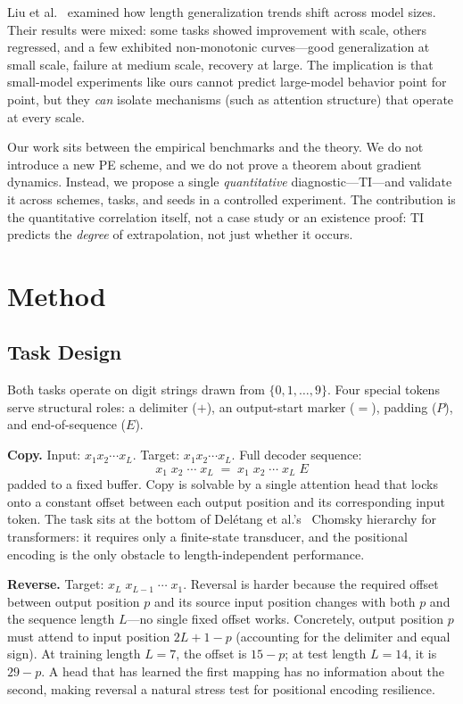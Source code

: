 \documentclass[10pt,twocolumn]{article}
\begin{document}
Liu et al.~\cite{liu2024scaling} examined how length generalization trends shift across model sizes.
Their results were mixed: some tasks showed improvement with scale, others regressed, and a few exhibited non-monotonic curves---good generalization at small scale, failure at medium scale, recovery at large.
The implication is that small-model experiments like ours cannot predict large-model behavior point for point, but they \emph{can} isolate mechanisms (such as attention structure) that operate at every scale.

Our work sits between the empirical benchmarks and the theory.
We do not introduce a new PE scheme, and we do not prove a theorem about gradient dynamics.
Instead, we propose a single \emph{quantitative} diagnostic---TI---and validate it across schemes, tasks, and seeds in a controlled experiment.
The contribution is the quantitative correlation itself, not a case study or an existence proof: TI predicts the \emph{degree} of extrapolation, not just whether it occurs.

\section{Method}
\label{sec:method}

\subsection{Task Design}
\label{sec:tasks}

Both tasks operate on digit strings drawn from $\{0, 1, \ldots, 9\}$.
Four special tokens serve structural roles: a delimiter ($+$), an output-start marker ($=$), padding ($P$), and end-of-sequence ($E$).

\textbf{Copy.}\quad
Input: $x_1 x_2 \cdots x_L$. Target: $x_1 x_2 \cdots x_L$. Full decoder sequence:
\[
x_1\; x_2\;\cdots\; x_L\; {=}\; x_1\; x_2\;\cdots\; x_L\; E
\]
padded to a fixed buffer.
Copy is solvable by a single attention head that locks onto a constant offset between each output position and its corresponding input token.
The task sits at the bottom of Del\'{e}tang et al.'s~\cite{deletang2023neural} Chomsky hierarchy for transformers: it requires only a finite-state transducer, and the positional encoding is the only obstacle to length-independent performance.

\textbf{Reverse.}\quad
Target: $x_L\; x_{L-1}\;\cdots\; x_1$.
Reversal is harder because the required offset between output position $p$ and its source input position changes with both $p$ and the sequence length $L$---no single fixed offset works.
Concretely, output position $p$ must attend to input position $2L + 1 - p$ (accounting for the delimiter and equal sign).
At training length $L = 7$, the offset is $15 - p$; at test length $L = 14$, it is $29 - p$.
A head that has learned the first mapping has no information about the second, making reversal a natural stress test for positional encoding resilience.
\end{document}
